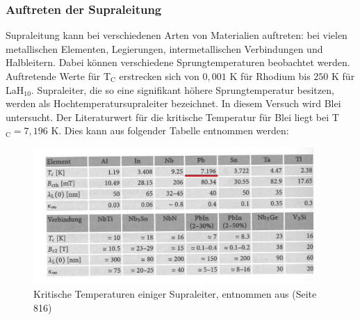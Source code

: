 \documentclass[german,  %
parskip=full,  %
]{scrartcl}
\begin{document}
\subsubsection{Auftreten der Supraleitung}
Supraleitung kann bei verschiedenen Arten von Materialien auftreten: bei vielen metallischen Elementen, Legierungen, intermetallischen Verbindungen und Halbleitern. Dabei können verschiedene Sprungtemperaturen beobachtet werden. Auftretende Werte für T$_{\text{C}}$ erstrecken sich von $0,001$ K für Rhodium bis $250$ K für LaH$_{10}$.  Supraleiter, die so eine signifikant höhere Sprungtemperatur besitzen, werden als Hochtemperatursupraleiter bezeichnet.
\newpage
In diesem Versuch wird Blei untersucht. Der Literaturwert für die kritische Temperatur für Blei liegt bei T$_{\text{C}} = 7,196$ K. Dies kann aus folgender Tabelle entnommen werden:
\begin{figure}[h!]
\centering
\includegraphics[width=0.95\textwidth]{tab}
\caption{Kritische Temperaturen einiger Supraleiter, entnommen aus \cite{6} (Seite 816)}
\end{figure}
\end{document}
